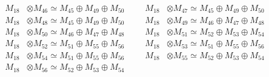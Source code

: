 \begin{align*}
M_{18} &\otimes M_{46} \simeq M_{45} \oplus M_{49} \oplus M_{50} &&& M_{18} &\otimes M_{47} \simeq M_{45} \oplus M_{49} \oplus M_{50}\\
M_{18} &\otimes M_{48} \simeq M_{45} \oplus M_{49} \oplus M_{50} &&& M_{18} &\otimes M_{49} \simeq M_{46} \oplus M_{47} \oplus M_{48}\\
M_{18} &\otimes M_{50} \simeq M_{46} \oplus M_{47} \oplus M_{48} &&& M_{18} &\otimes M_{51} \simeq M_{52} \oplus M_{53} \oplus M_{54}\\
M_{18} &\otimes M_{52} \simeq M_{51} \oplus M_{55} \oplus M_{56} &&& M_{18} &\otimes M_{53} \simeq M_{51} \oplus M_{55} \oplus M_{56}\\
M_{18} &\otimes M_{54} \simeq M_{51} \oplus M_{55} \oplus M_{56} &&& M_{18} &\otimes M_{55} \simeq M_{52} \oplus M_{53} \oplus M_{54}\\
M_{18} &\otimes M_{56} \simeq M_{52} \oplus M_{53} \oplus M_{54}
\end{align*}

